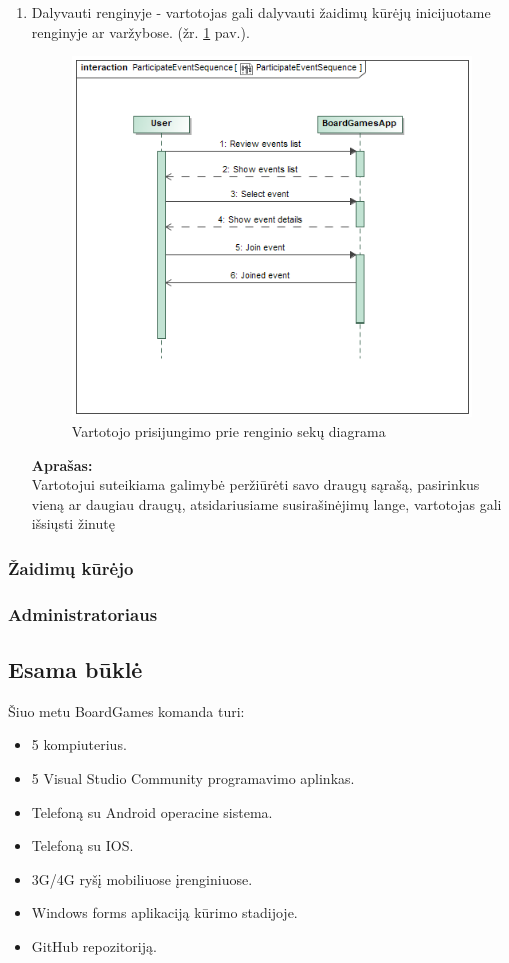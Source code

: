\documentclass{VUMIFPSkursinis}
\begin{document}
\begin{enumerate}
			\item Dalyvauti renginyje - vartotojas gali dalyvauti žaidimų kūrėjų 
			inicijuotame renginyje ar varžybose. (žr. \ref{img:ParticipateEventSequence} pav.).
				\begin{figure}[H]
					\centering
					\includegraphics[scale=0.5]{img/ParticipateEventSequence}
					\caption{Vartotojo prisijungimo prie renginio sekų diagrama}
					\label{img:ParticipateEventSequence}
				\end{figure}
				\textbf{Aprašas:}\\
					Vartotojui suteikiama galimybė peržiūrėti savo draugų sąrašą, 
					pasirinkus vieną ar daugiau draugų, atsidariusiame 
					susirašinėjimų lange, vartotojas gali išsiųsti žinutę					
		\end{enumerate}	
		
			
		\subsubsection {Žaidimų kūrėjo}
		\subsubsection {Administratoriaus}
		
	\subsection {Esama būklė}
	Šiuo metu BoardGames komanda turi:
	\renewcommand{\labelitemi}{$\bullet$}
		\begin{itemize}
			\item 5 kompiuterius.
			\item 5 Visual Studio Community programavimo aplinkas.
			\item Telefoną su Android operacine sistema.
			\item Telefoną su IOS.
			\item 3G/4G ryšį mobiliuose įrenginiuose.
			\item Windows forms aplikaciją kūrimo stadijoje.
			\item GitHub repozitoriją.
		\end{itemize}	
\end{document}
